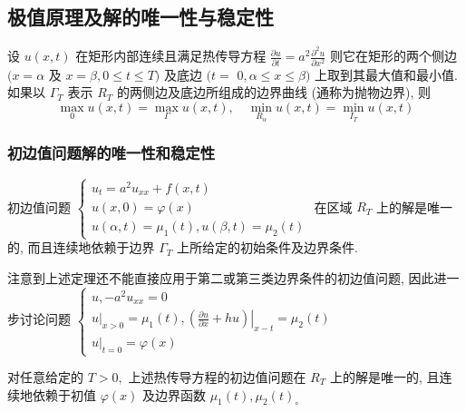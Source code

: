 \documentclass[10pt]{yerbaformat}
\begin{document}
\subsection{极值原理及解的唯一性与稳定性}


\begin{theorem}[极值原理]
    设 $u(x, t)$ 在矩形内部连续且满足热传导方程 $\frac{\partial u}{\partial t}=a^{2} \frac{\partial^{2} u}{\partial x^{2}}$ 则它在矩形的两个侧边 $(x=\alpha$ 及 $x=\beta, 0 \leqslant t \leqslant T)$ 及底边 $(t=$ $0, \alpha \leqslant x \leqslant \beta)$ 上取到其最大值和最小值.如果以 $\Gamma_{T}$ 表示 $R_{T}$ 的两侧边及底边所组成的边界曲线 (通称为抛物边界), 则
    $$
        \max _{0} u(x, t)=\max _{\Gamma} u(x, t), \quad \min _{R_{\alpha}} u(x, t)=\min _{I_{T}} u(x, t)
    $$
\end{theorem}

\subsubsection{初边值问题解的唯一性和稳定性}

\begin{theorem}
    初边值问题 $ \left\{\begin{array}{l}
            u_{t}=a^{2} u_{x x}+f(x, t) \\
            u(x, 0)=\varphi(x)          \\
            u(\alpha, t)=\mu_{1}(t), u(\beta, t)=\mu_{2}(t)
        \end{array}\right.$ 在区域 $R_{T}$ 上的解是唯一的, 而且连续地依赖于边界 $\Gamma_{T}$ 上所给定的初始条件及边界条件.
\end{theorem}

\par 注意到上述定理还不能直接应用于第二或第三类边界条件的初边值问题, 因此进一步讨论问题 $\left\{\begin{array}{l}u,-a^{2} u_{x x}=0 \\ \left.u\right|_{x>0}=\mu_{1}(t),\left.\left(\frac{\partial u}{\partial x}+h u\right)\right|_{x-t}=\mu_{2}(t) \\ \left.u\right|_{t=0}=\varphi(x)\end{array}\right.$

\begin{theorem}
    对任意给定的 $T>0,$ 上述热传导方程的初边值问题在 $R_{T}$ 上的解是唯一的, 且连续地依赖于初值 $\varphi(x)$ 及边界函数 $\mu_{1}(t), \mu_{2}(t)_{\circ}$
\end{theorem}
\end{document}
